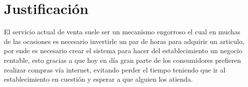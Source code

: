 	\section{Justificación}
	El servicio actual de venta suele ser un mecanismo engorroso el cual en muchas de las ocasiones es necesario invertirle un par de horas para adquirir un articulo, por ende es necesario crear el sistema para hacer del establecimiento un negocio rentable, esto gracias a que hoy en día gran parte de los consumidores prefieren realizar compras vía internet, evitando perder el tiempo teniendo que ir al establecimiento en cuestión y esperar a que alguien los atienda.\\ \\
	